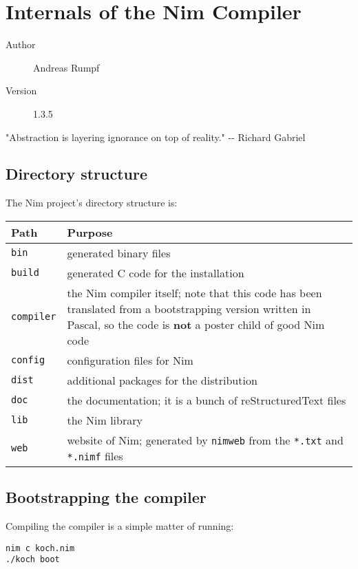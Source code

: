 \hypertarget{internals-of-the-nim-compiler}{%
\section{Internals of the Nim
Compiler}\label{internals-of-the-nim-compiler}}

\begin{description}
\item[Author]
Andreas Rumpf
\item[Version]
1.3.5
\end{description}

"Abstraction is layering ignorance on top of reality." -\/- Richard
Gabriel

\hypertarget{directory-structure}{%
\subsection{Directory structure}\label{directory-structure}}

The Nim project's directory structure is:

\begin{longtable}[]{@{}ll@{}}
\toprule
Path & Purpose\tabularnewline
\midrule
\endhead
\texttt{bin} & generated binary files\tabularnewline
\texttt{build} & generated C code for the installation\tabularnewline
\texttt{compiler} & the Nim compiler itself; note that this code has
been translated from a bootstrapping version written in Pascal, so the
code is \textbf{not} a poster child of good Nim code\tabularnewline
\texttt{config} & configuration files for Nim\tabularnewline
\texttt{dist} & additional packages for the distribution\tabularnewline
\texttt{doc} & the documentation; it is a bunch of reStructuredText
files\tabularnewline
\texttt{lib} & the Nim library\tabularnewline
\texttt{web} & website of Nim; generated by \texttt{nimweb} from the
\texttt{*.txt} and \texttt{*.nimf} files\tabularnewline
\bottomrule
\end{longtable}

\hypertarget{bootstrapping-the-compiler}{%
\subsection{Bootstrapping the
compiler}\label{bootstrapping-the-compiler}}

Compiling the compiler is a simple matter of running:

\begin{verbatim}
nim c koch.nim
./koch boot
\end{verbatim}

